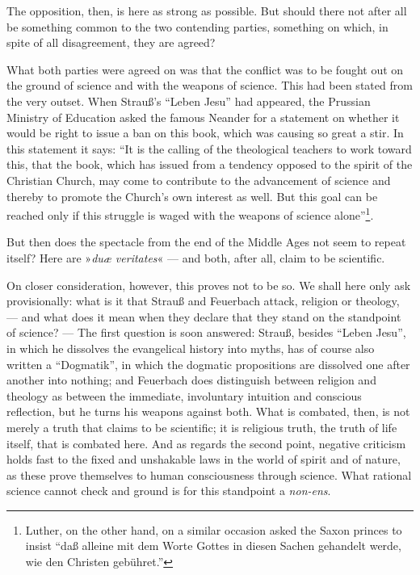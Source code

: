 \documentclass[12pt,a4paper]{book}
\newcommand{\opage}[1]{\marginnote{\footnotesize\textit{[#1]}}}
\begin{document}
The opposition, then, is here as strong as possible. But should there not
after all be something common to the two contending parties, something on
which, in spite of all disagreement, they are agreed?

What both parties were agreed on was that the conflict was to be fought out on
the ground of science and with the weapons of science. This had been stated
from the very outset. When Strauß's ``Leben Jesu'' had appeared, the Prussian
Ministry of Education asked the famous Neander for a statement on whether it
would be right to issue a ban on this book, which was causing so great a stir.
In this statement it says: ``It is the calling of the theological teachers to
work toward this, that the book, which has issued from a tendency opposed to
the spirit of the Christian Church, may come to contribute to the advancement
of science and thereby to promote the Church's own interest as well. But this
goal can be reached only if this struggle is waged with the weapons of science
alone''\footnote{Luther, on the other hand, on a similar occasion asked the
Saxon princes to insist ``daß alleine mit dem Worte Gottes in diesen Sachen
gehandelt werde, wie den Christen gebühret.''}.

But then does the spectacle from the end of the Middle Ages not seem to repeat
itself? Here are »\textit{duæ veritates}« --- and both, after all, claim to be
scientific.

On closer consideration, however, this proves not to be so. We shall here only
ask provisionally: what is it that Strauß and Feuerbach attack, religion or
theology, --- and what does it mean when they declare that they stand on the
standpoint of science? --- The first question is soon answered:
\opage{18}\setcounter{footnote}{0}%
Strauß, besides ``Leben Jesu'', in which he dissolves the evangelical history
into myths, has of course also written a ``Dogmatik'', in which the dogmatic
propositions are dissolved one after another into nothing; and Feuerbach does
distinguish between religion and theology as between the immediate,
involuntary intuition and conscious reflection, but he turns his weapons
against both. What is combated, then, is not merely a truth that claims to be
scientific; it is religious truth, the truth of life itself, that is combated
here. And as regards the second point, negative criticism holds fast to the
fixed and unshakable laws in the world of spirit and of nature, as these
prove themselves to human consciousness through science. What rational science
cannot check and ground is for this standpoint a \textit{non-ens}.
\end{document}
